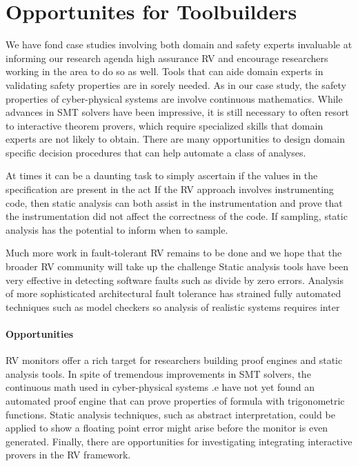 \section{Opportunites for Toolbuilders}\label{sec:oportunities} 
We have fond case studies involving both
domain and safety experts invaluable at informing our research agenda
high assurance RV and encourage researchers working in the area to do
so as well.  Tools that can aide domain experts in validating safety
properties are in sorely needed.  As in our case study, the safety
properties of cyber-physical systems are involve continuous
mathematics. While advances in SMT solvers have been impressive, it is
still necessary to often resort to interactive theorem provers, which
require specialized skills that domain experts are not likely to
obtain.  There are many opportunities to design  domain specific decision procedures
that can help automate a class of analyses. 



At times it can be a daunting task to simply
ascertain if the values in the specification are present in the act If the RV approach involves
instrumenting code, then static analysis can both assist in the
instrumentation and prove that the instrumentation did not affect the
correctness of the code. If sampling, static analysis has the
potential to inform when to sample. 
  
  Much more work in fault-tolerant RV remains
 to be done and we hope that the broader RV community will take up the
 challenge Static analysis tools have been very effective in detecting
 software faults such as divide by zero errors. Analysis of more
 sophisticated architectural fault tolerance has strained fully
 automated techniques such as model checkers so analysis of realistic
 systems requires inter


\paragraph{Opportunities} RV monitors offer a rich target for
researchers building proof engines and static analysis tools.  In
spite of tremendous improvements in SMT solvers, the continuous math
used in cyber-physical systems .e have not yet found an automated
proof engine that can prove properties of formula with trigonometric
functions. Static analysis techniques, such as abstract interpretation,
could be applied to show a floating point error might arise before the
monitor is even generated. Finally, there are opportunities for
investigating integrating interactive provers in the RV framework. 
